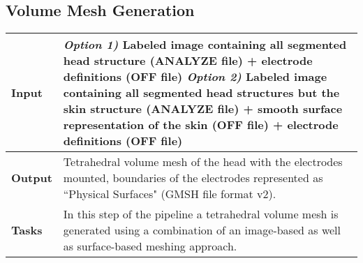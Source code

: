 \subsection{Volume Mesh Generation}
\begin{tabular}{ | p{} || p{} | }
    \hline
    \textbf{Input}  & \emph{Option 1)} Labeled image containing all segmented head structure (ANALYZE file) + 
                      electrode definitions (OFF file) \newline
                      \emph{Option 2)} Labeled image containing all segmented head structures but the skin
                      structure (ANALYZE file) +  smooth surface representation of the skin (OFF file)
                      + electrode definitions (OFF file) \\
    \hline
    \textbf{Output} & Tetrahedral volume mesh of the head with the electrodes mounted, boundaries of the
                      electrodes represented as ``Physical Surfaces" (GMSH file format v2). \\
    \hline
    \textbf{Tasks} & In this step of the pipeline a tetrahedral volume mesh is generated using a combination
                     of an image-based as well as surface-based meshing approach.\\
    \hline
\end{tabular}

\hspace{0.5cm}

